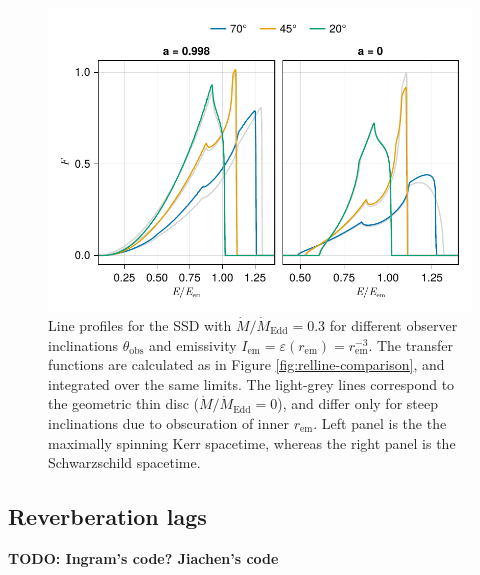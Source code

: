 \documentclass[fleqn,usenatbib]{mnras}
\newcommand{\todo}[1]{{\noindent \bf \color{red} TODO: #1}}
\begin{document}
\begin{figure}
	\centering
	\includegraphics[width=0.99\linewidth]{figures/lineprofiles.ssd.pdf}
	\caption{Line profiles for the SSD with $\dot{M} / \dot{M}_\text{Edd} = 0.3$ for different observer inclinations $\theta_\text{obs}$ and emissivity $I_\text{em} = \varepsilon(r_\text{em}) = r_\text{em}^{-3}$. The transfer functions are calculated as in Figure \ref{fig:relline-comparison}, and integrated over the same limits. The light-grey lines correspond to the geometric thin disc ($\dot{M} / \dot{M}_\text{Edd} = 0$), and differ only for steep inclinations due to obscuration of inner $r_\text{em}$. Left panel is the the maximally spinning Kerr spacetime, whereas the right panel is the Schwarzschild spacetime.}
	\label{fig:line-profile-ssd}
\end{figure}


\subsection{Reverberation lags}
\label{sec:lag-transfer-functions}

\citep{reynolds_x-ray_1999,wilkins_origin_2013,cackett_modelling_2014}

\todo{Ingram's code? Jiachen's code}
\end{document}
